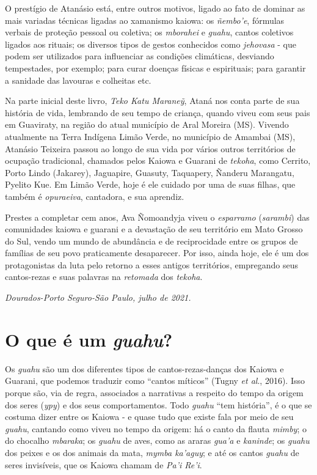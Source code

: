 O prestígio de Atanásio está, entre outros motivos, ligado ao fato de
dominar as mais variadas técnicas ligadas ao xamanismo kaiowa: os
\emph{ñembo'e}, fórmulas verbais de proteção pessoal ou coletiva; os
\emph{mborahei} e \emph{guahu}, cantos coletivos ligados aos rituais; os
diversos tipos de gestos conhecidos como \emph{jehovasa} - que podem ser
utilizados para influenciar as condições climáticas, desviando
tempestades, por exemplo; para curar doenças físicas e espirituais; para
garantir a sanidade das lavouras e colheitas etc.

Na parte inicial deste livro, \emph{Teko Katu Maraneỹ}, Ataná nos conta
parte de sua história de vida, lembrando de seu tempo de criança, quando
viveu com seus pais em Guaviraty, na região do atual município de Aral
Moreira (MS). Vivendo atualmente na Terra Indígena Limão Verde, no
município de Amambai (MS), Atanásio Teixeira passou ao longo de sua vida
por vários outros territórios de ocupação tradicional, chamados pelos
Kaiowa e Guarani de \emph{tekoha}, como Cerrito, Porto Lindo (Jakarey),
Jaguapire, Guasuty, Taquapery, Ñanderu Marangatu, Pyelito Kue. Em Limão
Verde, hoje é ele cuidado por uma de suas filhas, que também é
\emph{opuraeiva}, cantadora, e sua aprendiz.

Prestes a completar cem anos, Ava Ñomoandyja viveu o \emph{esparramo}
(\emph{sarambi}) das comunidades kaiowa e guarani e a devastação de seu
território em Mato Grosso do Sul, vendo um mundo de abundância e de
reciprocidade entre os grupos de famílias de seu povo praticamente
desaparecer. Por isso, ainda hoje, ele é um dos protagonistas da luta
pelo retorno a esses antigos territórios, empregando seus cantos-rezas e
suas palavras na \emph{retomada} dos \emph{tekoha}.

\emph{Dourados-Porto Seguro-São Paulo, julho de 2021.}

\chapter{O que é um \emph{guahu}?}

Os \emph{guahu} são um dos diferentes tipos de cantos-rezas-danças dos
Kaiowa e Guarani, que podemos traduzir como ``cantos míticos'' (Tugny
\emph{et al}., 2016). Isso porque são, via de regra, associados a
narrativas a respeito do tempo da origem dos seres (\emph{ypy}) e dos
seus comportamentos. Todo \emph{guahu} ``tem história'', é o que se
costuma dizer entre os Kaiowa - e quase tudo que existe fala por meio de
seu \emph{guahu}, cantando como viveu no tempo da origem: há o canto da
flauta \emph{mimby}; o do chocalho \emph{mbaraka}; os \emph{guahu} de
aves, como as araras \emph{gua'a} e \emph{kaninde}; os \emph{guahu} dos
peixes e os dos animais da mata, \emph{mymba ka'aguy}; e até os cantos
\emph{guahu} de seres invisíveis, que os Kaiowa chamam de \emph{Pa'i
Re'i}.

